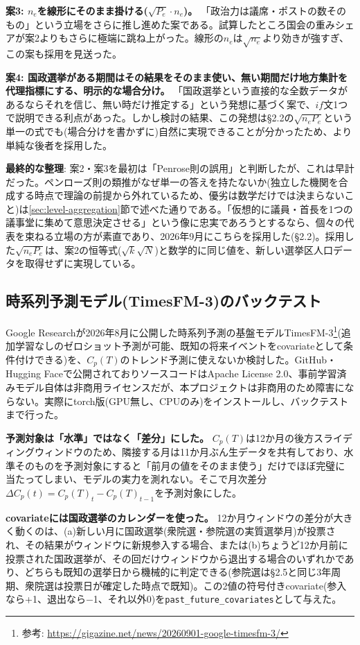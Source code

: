 \documentclass[a4paper,11pt]{ltjsarticle}
\begin{document}
\textbf{案3: $n_e$を線形にそのまま掛ける($\sqrt{P_e}\cdot n_e$)。} 「政治力は議席・ポストの数そのもの」という立場をさらに推し進めた案である。試算したところ国会の重みシェアが案2よりもさらに極端に跳ね上がった。線形の$n_e$は$\sqrt{n_e}$より効きが強すぎ、この案も採用を見送った。

\textbf{案4: 国政選挙がある期間はその結果をそのまま使い、無い期間だけ地方集計を代理指標にする、明示的な場合分け。} 「国政選挙という直接的な全数データがあるならそれを信じ、無い時だけ推定する」という発想に基づく案で、$if$文1つで説明できる利点があった。しかし検討の結果、この発想は\S2.2の$\sqrt{n_eP_e}$という単一の式でも(場合分けを書かずに)自然に実現できることが分かったため、より単純な後者を採用した。

\textbf{最終的な整理}: 案2・案3を最初は「Penrose則の誤用」と判断したが、これは早計だった。ペンローズ則の類推がなぜ単一の答えを持たないか(独立した機関を合成する時点で理論の前提から外れているため、優劣は数学だけでは決まらないこと)は\ref{sec:level-aggregation}節で述べた通りである。「仮想的に議員・首長を1つの議事堂に集めて意思決定させる」という像に忠実であろうとするなら、個々の代表を束ねる立場の方が素直であり、2026年9月にこちらを採用した(\S2.2)。採用した$\sqrt{n_eP_e}$は、案2の恒等式($\sqrt{k}\sqrt{N}$)と数学的に同じ値を、新しい選挙区人口データを取得せずに実現している。

\subsection{時系列予測モデル(TimesFM-3)のバックテスト}
\label{sec:timesfm-backtest}

Google Researchが2026年8月に公開した時系列予測の基盤モデルTimesFM-3\footnote{参考: \url{https://gigazine.net/news/20260901-google-timesfm-3/}}(追加学習なしのゼロショット予測が可能、既知の将来イベントをcovariateとして条件付けできる)を、$C_p(T)$のトレンド予測に使えないか検討した。GitHub・Hugging Faceで公開されておりソースコードはApache License 2.0、事前学習済みモデル自体は非商用ライセンスだが、本プロジェクトは非商用のため障害にならない。実際にtorch版(GPU無し、CPUのみ)をインストールし、バックテストまで行った。

\textbf{予測対象は「水準」ではなく「差分」にした。} $C_p(T)$は12か月の後方スライディングウィンドウのため、隣接する月は11か月ぶん生データを共有しており、水準そのものを予測対象にすると「前月の値をそのまま使う」だけでほぼ完璧に当たってしまい、モデルの実力を測れない。そこで月次差分$\Delta C_p(t) = C_p(T)_t - C_p(T)_{t-1}$を予測対象にした。

\textbf{covariateには国政選挙のカレンダーを使った。} 12か月ウィンドウの差分が大きく動くのは、(a)新しい月に国政選挙(衆院選・参院選の実質選挙月)が投票され、その結果がウィンドウに新規参入する場合、または(b)ちょうど12か月前に投票された国政選挙が、その回だけウィンドウから退出する場合のいずれかであり、どちらも既知の選挙日から機械的に判定できる(参院選は\S2.5と同じ3年周期、衆院選は投票日が確定した時点で既知)。この2値の符号付きcovariate(参入なら+1、退出なら$-$1、それ以外0)を\texttt{past\_future\_covariates}として与えた。
\end{document}
